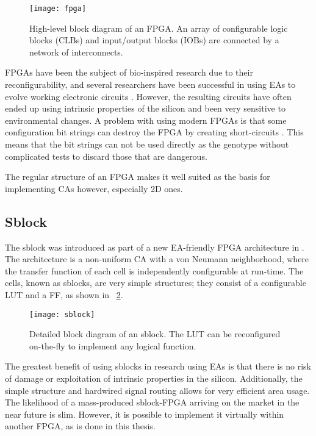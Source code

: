 \begin{figure}[!ht]
    \centering
    \texttt{[image: fpga]}
    \caption[FPGA]{
        High-level block diagram of an FPGA.
        An array of configurable logic blocks (CLBs) and input/output blocks (IOBs) are connected by a network of interconnects.
    }
    \label{fig:fpga}
\end{figure}

FPGAs have been the subject of bio-inspired research due to their reconfigurability, and several researchers have been successful in using EAs to evolve working electronic circuits \cite{huelsbergen1998evolution, thompson1997evolved}.
However, the resulting circuits have often ended up using intrinsic properties of the silicon and been very sensitive to environmental changes.
A problem with using modern FPGAs is that some configuration bit strings can destroy the FPGA by creating short-circuits \cite{xapp151, ug380}.
This means that the bit strings can not be used directly as the genotype without complicated tests to discard those that are dangerous.

The regular structure of an FPGA makes it well suited as the basis for implementing CAs however, especially 2D ones.

\subsection{Sblock}
\label{sec:sblock}

The sblock was introduced as part of a new EA-friendly FPGA architecture in \cite{haddow2000sblock}.
The architecture is a non-uniform CA with a von Neumann neighborhood, where the transfer function of each cell is independently configurable at run-time.
The cells, known as sblocks, are very simple structures; they consist of a configurable LUT and a FF, as shown in \figurename~\ref{fig:sblock}.

\begin{figure}[!ht]
    \centering
    \texttt{[image: sblock]}
    \caption[Sblock]{
        Detailed block diagram of an sblock.
        The LUT can be reconfigured on-the-fly to implement any logical function.
    }
    \label{fig:sblock}
\end{figure}

The greatest benefit of using sblocks in research using EAs is that there is no risk of damage or exploitation of intrinsic properties in the silicon.
Additionally, the simple structure and hardwired signal routing allows for very efficient area usage.
The likelihood of a mass-produced sblock-FPGA arriving on the market in the near future is slim.
However, it is possible to implement it virtually within another FPGA, as is done in this thesis.

